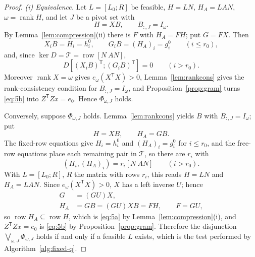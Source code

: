 \begin{proof}
\emph{(i) Equivalence.} Let $L=[L_0;R]$ be feasible, $H=LN$, $H_A=LAN$,
$\omega=\operatorname{rank}H$, and let $J$ be a pivot set with
\[
H=XB,\qquad B_{:,J}=I_\omega .
\]
By Lemma~\ref{lem:compression}(ii) there is $F$ with $H_A=FH$; put $G=FX$.
Then
\[
X_iB=H_i=h_i^0,\qquad G_iB=(H_A)_i=g_i^0\qquad(i\le r_0),
\]
and, since $\ker D=\mathcal T=\operatorname{row}[N\ AN]$,
\[
D[(X_iB)^{\mathsf T};(G_iB)^{\mathsf T}]=0\qquad(i>r_0).
\]
Moreover $\operatorname{rank}X=\omega$ gives $e_\omega(X^{\mathsf T}X)>0$,
Lemma~\ref{lem:rankcons} gives the rank-consistency condition for
$B_{:,J}=I_\omega$, and Proposition~\ref{prop:gram} turns \eqref{eq:5b} into
$Z^{\mathsf T}Zx=e_0$. Hence $\Phi_{\omega,J}$ holds.

Conversely, suppose $\Phi_{\omega,J}$ holds. Lemma~\ref{lem:rankcons} yields
$B$ with $B_{:,J}=I_\omega$; put
\[
H=XB,\qquad H_A=GB .
\]
The fixed-row equations give $H_i=h_i^0$ and $(H_A)_i=g_i^0$ for $i\le r_0$,
and the free-row equations place each remaining pair in $\mathcal T$, so there
are $r_i$ with
\[
(H_i,(H_A)_i)=r_i[N\ AN]\qquad(i>r_0).
\]
With $L=[L_0;R]$, $R$ the matrix with rows $r_i$, this reads $H=LN$ and
$H_A=LAN$. Since $e_\omega(X^{\mathsf T}X)>0$, $X$ has a left inverse $U$;
hence
\[
\begin{aligned}
G&=(GU)X,\\
H_A&=GB=(GU)XB=FH,\qquad F=GU,
\end{aligned}
\]
so $\operatorname{row}H_A\subseteq\operatorname{row}H$, which is
\eqref{eq:5a} by Lemma~\ref{lem:compression}(i), and $Z^{\mathsf T}Zx=e_0$ is
\eqref{eq:5b} by Proposition~\ref{prop:gram}. Therefore the disjunction
$\bigvee_{\omega,J}\Phi_{\omega,J}$ holds if and only if a feasible $L$
exists, which is the test performed by Algorithm~\ref{alg:fixed-q}.


\end{proof}
